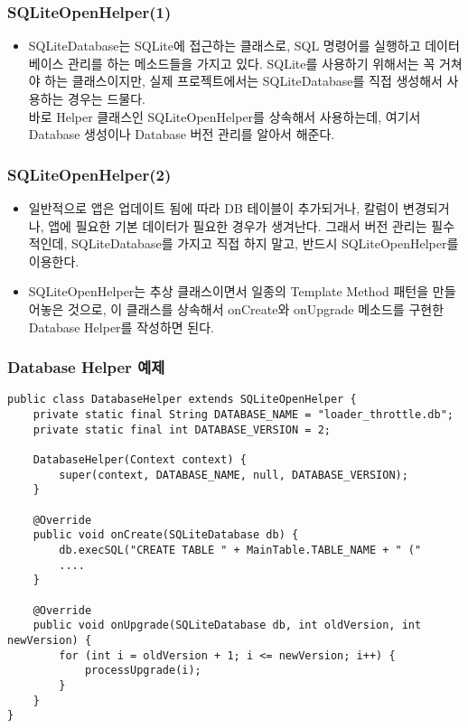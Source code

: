\documentclass{beamer}
\newcommand\Fontvi{\fontsize{8}{9.6}\selectfont}
\begin{document}
\begin{frame}
\frametitle{SQLiteOpenHelper(1)}
\begin{itemize}
\item SQLiteDatabase는 SQLite에 접근하는 클래스로, SQL 명령어를 실행하고 데이터베이스 관리를 하는 메소드들을 가지고 있다. SQLite를 사용하기 위해서는 꼭 거쳐야 하는 클래스이지만, 실제 프로젝트에서는 SQLiteDatabase를 직접 생성해서 사용하는 경우는 드물다.\\
바로 Helper 클래스인 SQLiteOpenHelper를 상속해서 사용하는데, 여기서 Database 생성이나 Database 버전 관리를 알아서 해준다.
\end{itemize}
\end{frame}

\begin{frame}
\frametitle{SQLiteOpenHelper(2)}
\begin{itemize}
\item 일반적으로 앱은 업데이트 됨에 따라 DB 테이블이 추가되거나, 칼럼이 변경되거나, 앱에 필요한 기본 데이터가 필요한 경우가 생겨난다. 그래서 버전 관리는 필수적인데, SQLiteDatabase를 가지고 직접 하지 말고, 반드시 SQLiteOpenHelper를 이용한다.
\item SQLiteOpenHelper는 추상 클래스이면서 일종의 Template Method 패턴을 만들어놓은 것으로, 이 클래스를 상속해서 onCreate와 onUpgrade 메소드를 구현한 Database Helper를 작성하면 된다.
\end{itemize}
\end{frame}

\begin{frame}[fragile]
\frametitle{Database Helper 예제}
\Fontvi
\begin{verbatim}
public class DatabaseHelper extends SQLiteOpenHelper {
    private static final String DATABASE_NAME = "loader_throttle.db";
    private static final int DATABASE_VERSION = 2;

    DatabaseHelper(Context context) {
        super(context, DATABASE_NAME, null, DATABASE_VERSION);
    }

    @Override
    public void onCreate(SQLiteDatabase db) {
        db.execSQL("CREATE TABLE " + MainTable.TABLE_NAME + " ("
        ....
    }

    @Override
    public void onUpgrade(SQLiteDatabase db, int oldVersion, int newVersion) {
        for (int i = oldVersion + 1; i <= newVersion; i++) {
            processUpgrade(i);
        }
    }
}
\end{verbatim}
\end{frame}
\end{document}
